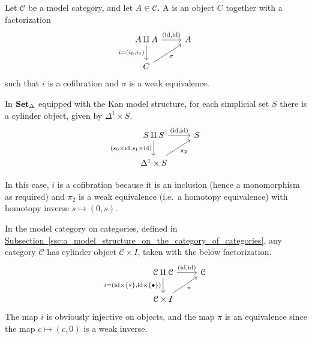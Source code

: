 \documentclass[main.tex]{subfiles}
\begin{document}
\begin{definition}
  \label{def:cylinder_object}
  Let $\mathcal{C}$ be a model category, and let $A \in \mathcal{C}$. A  is an object $C$ together with a factorization
  \begin{equation*}
    \begin{tikzcd}
      A \amalg A
      \arrow[r, "{(\id, \id)}"]
      \arrow[d, swap, "{i = (i_{0}, i_{1})}"]
      & A
      \\
      C
      \arrow[ur, swap, "\sigma"]
    \end{tikzcd}
  \end{equation*}
  such that $i$ is a cofibration and $\sigma$ is a weak equivalence.
\end{definition}

\begin{example}
  \label{eg:cylinder_objects_in_sset}
  In $\operatorname{\mathbf{Set}_{\Delta}}$ equipped with the Kan model structure, for each simplicial set $S$ there is a cylinder object, given by $\Delta^{1} \times S$.
  \begin{equation*}
    \begin{tikzcd}
      S \amalg S
      \arrow[r, "{(\id, \id)}"]
      \arrow[d, swap, "{(s_{0} \times \id, s_{1} \times \id)}"]
      & S
      \\
      \Delta^{1} \times S
      \arrow[ur, swap, "\pi_{2}"]
    \end{tikzcd}
  \end{equation*}

  In this case, $i$ is a cofibration because it is an inclusion (hence a monomorphism as required) and $\pi_{2}$ is a weak equivalence (i.e.\ a homotopy equivalence) with homotopy inverse $s \mapsto (0, s)$.
\end{example}

\begin{example}
  \label{eg:cylinder_objects_in_model_structure_on_cat}
  In the model category on categories, defined in \hyperref[ssc:a_model_structure_on_the_category_of_categories]{Subsection~\ref*{ssc:a_model_structure_on_the_category_of_categories}}, any category $\mathcal{C}$ has cylinder object $\mathcal{C} \times I$, taken with the below factorization.
  \begin{equation*}
    \begin{tikzcd}
      \mathcal{C} \amalg \mathcal{C}
      \arrow[d, swap, "i = {(\id \times \{*\}, \id \times \{\bullet\})}"]
      \arrow[r, "{(\id, \id)}"]
      & \mathcal{C}
      \\
      \mathcal{C} \times I
      \arrow[ur, swap, "\pi"]
    \end{tikzcd}
  \end{equation*}
  The map $i$ is obviously injective on objects, and the map $\pi$ is an equivalence since the map $c \mapsto (c, 0)$ is a weak inverse.
\end{example}
\end{document}
